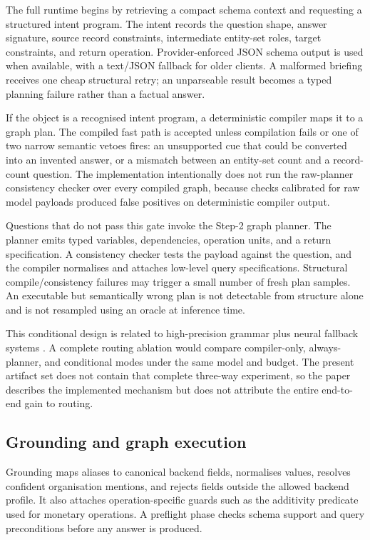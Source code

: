 The full runtime begins by retrieving a compact schema context and requesting a structured intent
program.  The intent records the question shape, answer signature, source record constraints,
intermediate entity-set roles, target constraints, and return operation.  Provider-enforced JSON
schema output is used when available, with a text/JSON fallback for older clients.  A malformed
briefing receives one cheap structural retry; an unparseable result becomes a typed planning
failure rather than a factual answer.

If the object is a recognised intent program, a deterministic compiler maps it to a graph plan.
The compiled fast path is accepted unless compilation fails or one of two narrow semantic vetoes
fires: an unsupported cue that could be converted into an invented answer, or a mismatch between
an entity-set count and a record-count question.  The implementation intentionally does not run
the raw-planner consistency checker over every compiled graph, because checks calibrated for raw
model payloads produced false positives on deterministic compiler output.

Questions that do not pass this gate invoke the Step-2 graph planner.  The planner emits typed
variables, dependencies, operation units, and a return specification.  A consistency checker
tests the payload against the question, and the compiler normalises and attaches low-level query
specifications.  Structural compile/consistency failures may trigger a small number of fresh
plan samples.  An executable but semantically wrong plan is not detectable from structure alone
and is not resampled using an oracle at inference time.

This conditional design is related to high-precision grammar plus neural fallback systems
\citep{shaw-etal-2021-compositional}.  A complete routing ablation would compare compiler-only,
always-planner, and conditional modes under the same model and budget.  The present artifact set
does not contain that complete three-way experiment, so the paper describes the implemented
mechanism but does not attribute the entire end-to-end gain to routing.

\subsection{Grounding and graph execution}
\label{sec:grounding}

Grounding maps aliases to canonical backend fields, normalises values, resolves confident
organisation mentions, and rejects fields outside the allowed backend profile.  It also attaches
operation-specific guards such as the additivity predicate used for monetary operations.  A
preflight phase checks schema support and query preconditions before any answer is produced.


